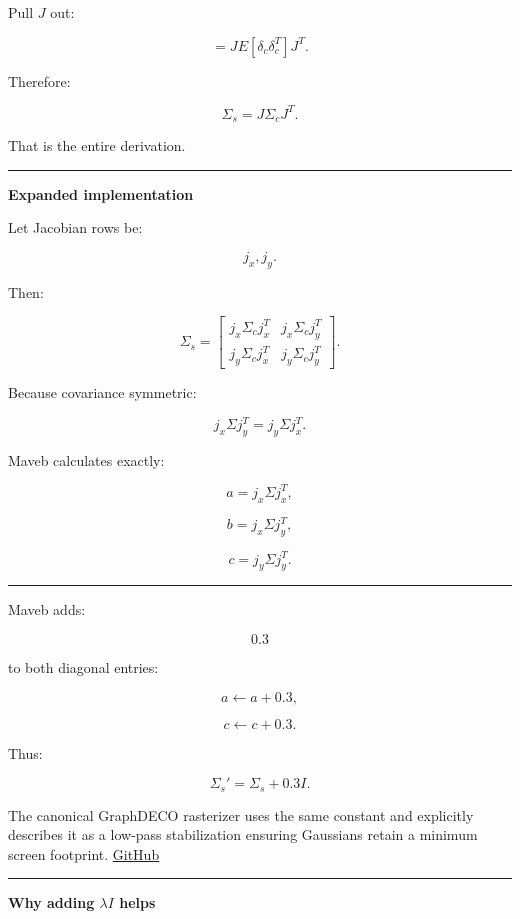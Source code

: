 Pull \(J\) out:

\[
=
J
E[
\delta_c\delta_c^T
]
J^T.
\]

Therefore:

\[
\boxed{
\Sigma_s=
J\Sigma_cJ^T.
}
\]

That is the entire derivation.

\begin{center}\rule{0.5\linewidth}{0.5pt}\end{center}

\textbf{Expanded implementation}

Let Jacobian rows be:

\[
j_x,
j_y.
\]

Then:

\[
\Sigma_s=
\begin{bmatrix}
j_x\Sigma_cj_x^T
&
j_x\Sigma_cj_y^T
\\
j_y\Sigma_cj_x^T
&
j_y\Sigma_cj_y^T
\end{bmatrix}.
\]

Because covariance symmetric:

\[
j_x\Sigma j_y^T
=
j_y\Sigma j_x^T.
\]

Maveb calculates exactly:

\[
a=j_x\Sigma j_x^T,
\]

\[
b=j_x\Sigma j_y^T,
\]

\[
c=j_y\Sigma j_y^T.
\]

\begin{center}\rule{0.5\linewidth}{0.5pt}\end{center}

Maveb adds:

\[
0.3
\]

to both diagonal entries:

\[
a\leftarrow a+0.3,
\]

\[
c\leftarrow c+0.3.
\]

Thus:

\[
\boxed{
\Sigma_s'
=
\Sigma_s
+
0.3I.
}
\]

The canonical GraphDECO rasterizer uses the same constant and explicitly describes it as a low-pass stabilization ensuring Gaussians retain a minimum screen footprint. \href{https://github.com/graphdeco-inria/diff-gaussian-rasterization/blob/main/cuda_rasterizer/forward.cu?utm_source=chatgpt.com}{GitHub}

\begin{center}\rule{0.5\linewidth}{0.5pt}\end{center}

\textbf{Why adding \(\lambda I\) helps}

